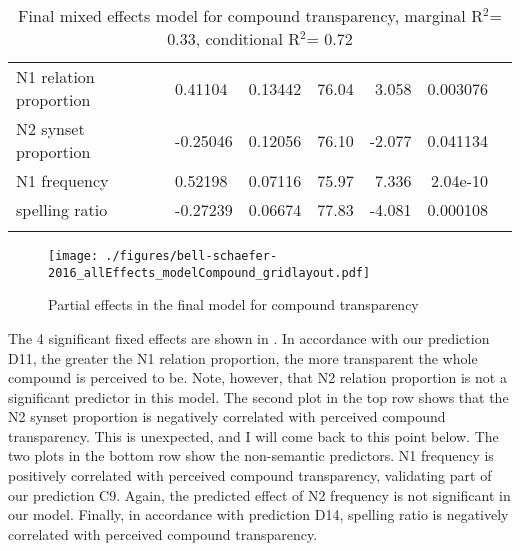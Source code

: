 \begin{table}
\begin{tabularx}{.95\textwidth}{llrrrrr}
N1 relation proportion   & 0.41104&   0.13442&76.04&  3.058&0.003076\\
N2 synset proportion&-0.25046&   0.12056&76.10& -2.077&0.041134\\
N1 frequency           & 0.52198&   0.07116&75.97&  7.336&2.04e-10\\
spelling ratio       &-0.27239&   0.06674&77.83& -4.081&0.000108\\\lspbottomrule
\end{tabularx}
  \caption{Final mixed effects model for compound transparency,
    marginal R$^2$= 0.33, conditional R$^2$= 0.72}
  \label{tab:bellschaefer2016mixed-whole-1}
\end{table}

\begin{figure}[!htb]
  \centering
\texttt{[image: ./figures/bell-schaefer-2016\_allEffects\_modelCompound\_gridlayout.pdf]}
  \caption{Partial effects in the final model for compound transparency}
\label{fig:bellschaefer2016_model_compound1}
\end{figure}

The 4 significant fixed effects are shown in
. In accordance with our
prediction D11, the greater the N1 relation proportion, the more
transparent the whole compound is perceived to be. Note, however, that
N2 relation proportion is not a significant predictor in this
model. The second plot in the top row shows that the N2 synset
proportion is negatively correlated with perceived compound
transparency. This is unexpected, and I will come back to this point
below. The two plots in the bottom row show the non-semantic
predictors. N1 frequency is positively correlated with perceived
compound transparency, validating part of our prediction C9. Again,
the predicted effect of N2 frequency is not significant in our
model. Finally, in accordance with prediction D14, spelling ratio is
negatively correlated with perceived compound transparency.

